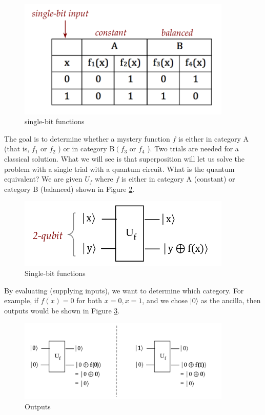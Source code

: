 \documentclass[main.tex]{subfiles}
\begin{document}
    \begin{figure}
        \centering
        \includegraphics[width=4in]{notes/figs/n11/07oracle4.png}
            \caption{single-bit functions}
        \label{fig:07oracle4}
    \end{figure}
    
    The goal is to determine whether a mystery function $f$ is either in category A (that is, $f_{1}$ or $f_{2}$ ) or in category $\mathrm{B}\left(f_{3}\right.$ or $f_{4}$ ). Two trials are needed for a classical solution. What we will see is that superposition will let us solve the problem with a single trial with a quantum circuit. What is the quantum equivalent? We are given $U_{f}$ where $f$ is either in category A (constant) or category B (balanced) shown in Figure \ref{fig:08deutsch2}.
    
    \begin{figure}
        \centering
        \includegraphics[width=4in]{notes/figs/n11/08deutsch2.png}
            \caption{Single-bit functions}
        \label{fig:08deutsch2}
    \end{figure}
    
    By evaluating (supplying inputs), we want to determine which category. For example, if $f(x)=0$ for both $x=0, x=1$, and we chose $|0\rangle$ as the ancilla, then outputs would be shown in Figure \ref{fig:09deutsch3}.
    
    \begin{figure}
        \centering
        \includegraphics[width=4in]{notes/figs/n11/09deutsch3.png}
            \caption{Outputs}
        \label{fig:09deutsch3}
    \end{figure}
    
\end{document}
